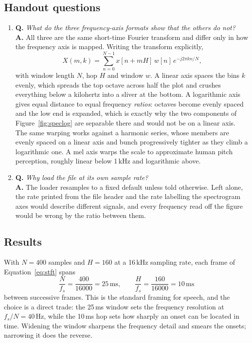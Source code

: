 \documentclass[11pt]{article}
\begin{document}
\subsection*{Handout questions}

\begin{enumerate}
  \item \textbf{Q.} \textit{What do the three frequency-axis formats show that
        the others do not?} \\
        \textbf{A.} All three are the same short-time Fourier transform and
        differ only in how the frequency axis is mapped. Writing the transform
        explicitly,
        \begin{equation}
          X(m, k) = \sum_{n=0}^{N-1} x[n + mH]\, w[n]\,
                    e^{-j 2 \pi k n / N},
          \label{eq:stft}
        \end{equation}
        with window length $N$, hop $H$ and window $w$. A linear axis spaces
        the bins $k$ evenly, which spreads the top octave across half the plot
        and crushes everything below a kilohertz into a sliver at the bottom.
        A logarithmic axis gives equal distance to equal frequency
        \emph{ratios}: octaves become evenly spaced and the low end is
        expanded, which is exactly why the two components of
        Figure~\ref{fig:speclog} are separable there and would not be on a
        linear axis. The same warping works against a harmonic series, whose
        members are evenly spaced on a linear axis and bunch progressively
        tighter as they climb a logarithmic one. A mel axis warps the scale to
        approximate human pitch perception, roughly linear below 1\,kHz and
        logarithmic above.

  \item \textbf{Q.} \textit{Why load the file at its own sample rate?} \\
        \textbf{A.} The loader resamples to a fixed default unless told
        otherwise. Left alone, the rate printed from the file header and the
        rate labelling the spectrogram axes would describe different signals,
        and every frequency read off the figure would be wrong by the ratio
        between them.
\end{enumerate}

\subsection*{Results}

With $N = 400$ samples and $H = 160$ at a 16\,kHz sampling rate, each frame of
Equation~\ref{eq:stft} spans
\[
  \frac{N}{f_s} = \frac{400}{16000} = 25\,\text{ms},
  \qquad
  \frac{H}{f_s} = \frac{160}{16000} = 10\,\text{ms}
\]
between successive frames. This is the standard framing for speech, and the
choice is a direct trade: the 25\,ms window sets the frequency resolution at
$f_s/N = 40$\,Hz, while the 10\,ms hop sets how sharply an onset can be located
in time. Widening the window sharpens the frequency detail and smears the
onsets; narrowing it does the reverse.
\end{document}
